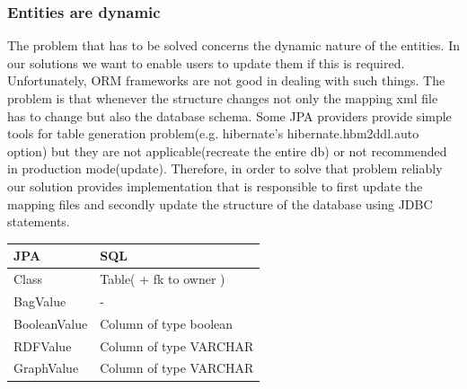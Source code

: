 \documentclass[a4paper, notitlepage]{article}
\begin{document}
\subsubsection{Entities are dynamic}
The problem that has to be solved concerns the dynamic nature of the entities. In our solutions we want to enable users to update them if this is required. Unfortunately, ORM frameworks are not good in dealing with such things. The problem is that whenever the structure changes not only the mapping xml file has to change but also the database schema. Some JPA providers provide simple tools for table generation problem(e.g. hibernate's hibernate.hbm2ddl.auto option) but they are not applicable(recreate the entire db) or not recommended in production mode(update). Therefore, in order to solve that problem reliably our solution provides implementation that is responsible to first update the mapping files and secondly update the structure of the database using JDBC statements.

\begin{center}
    \begin{tabular}{ | l | l |}
    \hline
    JPA & SQL  \\ \hline
    Class & Table( + fk to owner ) \\ \hline
    BagValue & -  \\ \hline
    BooleanValue & Column of type boolean  \\ \hline
    RDFValue & Column of type VARCHAR  \\ \hline
	GraphValue & Column of type VARCHAR  \\ \hline
    \end{tabular}
\end{center}
\end{document}
